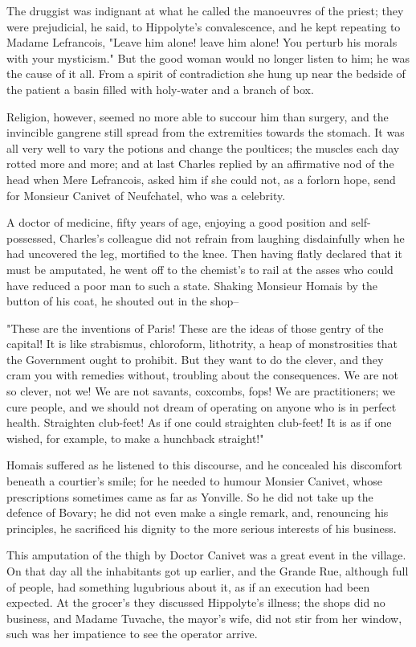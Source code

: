 \documentclass[11pt,twocolumn]{ltugboat}
\begin{document}
The druggist was indignant at what he called the manoeuvres of the
priest; they were prejudicial, he said, to Hippolyte's convalescence,
and he kept repeating to Madame Lefrancois, "Leave him alone! leave him
alone! You perturb his morals with your mysticism." But the good woman
would no longer listen to him; he was the cause of it all. From a spirit
of contradiction she hung up near the bedside of the patient a basin
filled with holy-water and a branch of box.

Religion, however, seemed no more able to succour him than surgery, and
the invincible gangrene still spread from the extremities towards
the stomach. It was all very well to vary the potions and change the
poultices; the muscles each day rotted more and more; and at last
Charles replied by an affirmative nod of the head when Mere Lefrancois,
asked him if she could not, as a forlorn hope, send for Monsieur Canivet
of Neufchatel, who was a celebrity.

A doctor of medicine, fifty years of age, enjoying a good position
and self-possessed, Charles's colleague did not refrain from laughing
disdainfully when he had uncovered the leg, mortified to the knee. Then
having flatly declared that it must be amputated, he went off to the
chemist's to rail at the asses who could have reduced a poor man to such
a state. Shaking Monsieur Homais by the button of his coat, he shouted
out in the shop--

"These are the inventions of Paris! These are the ideas of those gentry
of the capital! It is like strabismus, chloroform, lithotrity, a heap of
monstrosities that the Government ought to prohibit. But they want to do
the clever, and they cram you with remedies without, troubling about
the consequences. We are not so clever, not we! We are not savants,
coxcombs, fops! We are practitioners; we cure people, and we should
not dream of operating on anyone who is in perfect health. Straighten
club-feet! As if one could straighten club-feet! It is as if one wished,
for example, to make a hunchback straight!"

Homais suffered as he listened to this discourse, and he concealed his
discomfort beneath a courtier's smile; for he needed to humour Monsier
Canivet, whose prescriptions sometimes came as far as Yonville. So he
did not take up the defence of Bovary; he did not even make a single
remark, and, renouncing his principles, he sacrificed his dignity to the
more serious interests of his business.

This amputation of the thigh by Doctor Canivet was a great event in the
village. On that day all the inhabitants got up earlier, and the Grande
Rue, although full of people, had something lugubrious about it, as
if an execution had been expected. At the grocer's they discussed
Hippolyte's illness; the shops did no business, and Madame Tuvache, the
mayor's wife, did not stir from her window, such was her impatience to
see the operator arrive.
\end{document}
